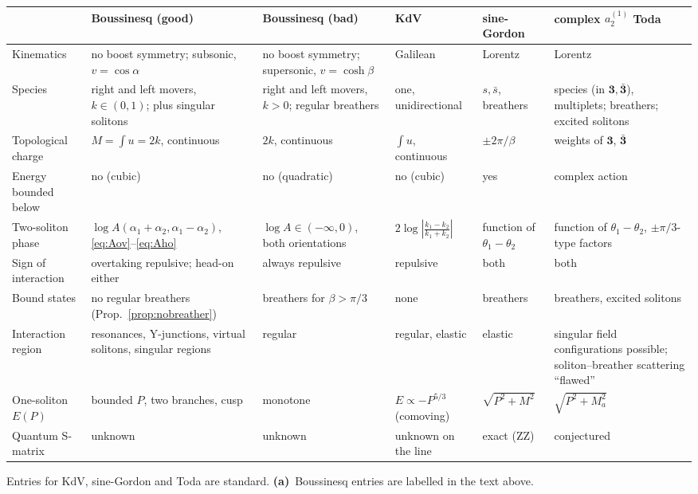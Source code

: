 \documentclass[11pt,a4paper]{article}
\newcommand{\La}{\textsf{\textbf{(a)}}}
\theoremstyle{remark}
\begin{document}
\begin{center}\footnotesize
\setlength{\tabcolsep}{4pt}
\begin{tabular}{@{}>{\raggedright}p{2.2cm}>{\raggedright}p{2.6cm}>{\raggedright}p{2.6cm}>{\raggedright}p{2.2cm}>{\raggedright}p{2.4cm}>{\raggedright\arraybackslash}p{2.6cm}@{}}
\toprule
& Boussinesq (good) & Boussinesq (bad) & KdV & sine-Gordon & complex $a_2^{(1)}$ Toda \cite{Hol92,Hol93}\\\midrule
Kinematics & no boost symmetry; subsonic, $v=\cos\alpha$ & no boost symmetry; supersonic, $v=\cosh\beta$ & Galilean & Lorentz & Lorentz\\
Species & right and left movers, $k\in(0,1)$; plus singular solitons & right and left movers, $k>0$; regular breathers & one, unidirectional & $s,\bar s$, breathers & 2 species (in $\mathbf 3,\bar{\mathbf 3}$), multiplets; breathers; excited solitons\\
Topological charge & $M=\int u=2k$, continuous & $2k$, continuous & $\int u$, continuous & $\pm2\pi/\beta$ & weights of $\mathbf3$, $\bar{\mathbf3}$\\
Energy bounded below & no (cubic) & no (quadratic) & no (cubic) & yes & complex action\\
Two-soliton phase & $\log A(\alpha_1\!+\!\alpha_2,\alpha_1\!-\!\alpha_2)$, \eqref{eq:Aov}--\eqref{eq:Aho} & $\log A\in(-\infty,0)$, both orientations & $2\log|\frac{k_1-k_2}{k_1+k_2}|$ & function of $\theta_1-\theta_2$ & function of $\theta_1-\theta_2$, $\pm\pi/3$-type factors\\
Sign of interaction & overtaking repulsive; head-on either & always repulsive & repulsive & both & both\\
Bound states & no regular breathers (Prop.~\ref{prop:nobreather}) & breathers for $\beta>\pi/3$ \cite{BC} & none & breathers & breathers, excited solitons\\
Interaction region & resonances, Y-junctions, virtual solitons, singular regions & regular & regular, elastic & elastic & singular field configurations possible; soliton--breather scattering ``flawed'' \cite{TW}\\
One-soliton $E(P)$ & bounded $P$, two branches, cusp & monotone & $E\propto -P^{5/3}$ (comoving) & $\sqrt{P^2+M^2}$ & $\sqrt{P^2+M_a^2}$\\
Quantum S-matrix & unknown & unknown & unknown on the line & exact (ZZ) & conjectured \cite{Hol93,Johnson,Gand}\\
\bottomrule
\end{tabular}
\end{center}
Entries for KdV, sine-Gordon and Toda are standard. \La\ Boussinesq entries are labelled in the text above.
\end{document}
